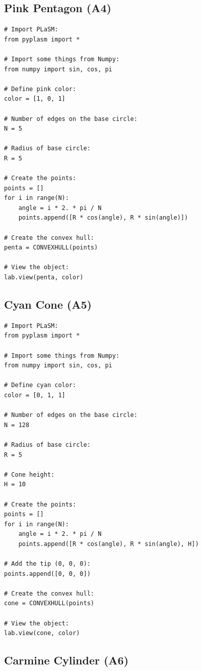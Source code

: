 \documentclass{article}
\begin{document}
\subsection{Pink Pentagon (A4)}

\begin{verbatim}
# Import PLaSM:
from pyplasm import *

# Import some things from Numpy:
from numpy import sin, cos, pi

# Define pink color:
color = [1, 0, 1]

# Number of edges on the base circle:
N = 5

# Radius of base circle:
R = 5

# Create the points:
points = []
for i in range(N):
    angle = i * 2. * pi / N
    points.append([R * cos(angle), R * sin(angle)])
    
# Create the convex hull:
penta = CONVEXHULL(points)

# View the object:
lab.view(penta, color)
\end{verbatim}


\subsection{Cyan Cone (A5)}

\begin{verbatim}
# Import PLaSM:
from pyplasm import *

# Import some things from Numpy:
from numpy import sin, cos, pi

# Define cyan color:
color = [0, 1, 1]

# Number of edges on the base circle:
N = 128

# Radius of base circle:
R = 5

# Cone height:
H = 10

# Create the points:
points = []
for i in range(N):
    angle = i * 2. * pi / N
    points.append([R * cos(angle), R * sin(angle), H])

# Add the tip (0, 0, 0):
points.append([0, 0, 0])
    
# Create the convex hull:
cone = CONVEXHULL(points)

# View the object:
lab.view(cone, color)
\end{verbatim}


\subsection{Carmine Cylinder (A6)}
\end{document}
